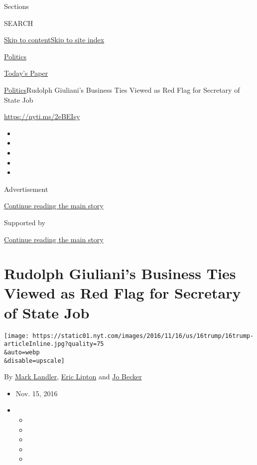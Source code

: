 Sections

SEARCH

\protect\hyperlink{site-content}{Skip to
content}\protect\hyperlink{site-index}{Skip to site index}

\href{https://www.nytimes.com/section/politics}{Politics}

\href{https://myaccount.nytimes.com/auth/login?response_type=cookie\&client_id=vi}{}

\href{https://www.nytimes.com/section/todayspaper}{Today's Paper}

\href{/section/politics}{Politics}\textbar{}Rudolph Giuliani's Business
Ties Viewed as Red Flag for Secretary of State Job

\url{https://nyti.ms/2eBEIsy}

\begin{itemize}
\item
\item
\item
\item
\item
\end{itemize}

Advertisement

\protect\hyperlink{after-top}{Continue reading the main story}

Supported by

\protect\hyperlink{after-sponsor}{Continue reading the main story}

\hypertarget{rudolph-giulianis-business-ties-viewed-as-red-flag-for-secretary-of-state-job}{%
\section{Rudolph Giuliani's Business Ties Viewed as Red Flag for
Secretary of State
Job}\label{rudolph-giulianis-business-ties-viewed-as-red-flag-for-secretary-of-state-job}}

\texttt{[image: https://static01.nyt.com/images/2016/11/16/us/16trump/16trump-articleInline.jpg?quality=75\\\&auto=webp\\\&disable=upscale]}

By \href{http://www.nytimes.com/by/mark-landler}{Mark Landler},
\href{http://www.nytimes.com/by/eric-lipton}{Eric Lipton} and
\href{http://www.nytimes.com/by/jo-becker}{Jo Becker}

\begin{itemize}
\item
  Nov. 15, 2016
\item
  \begin{itemize}
  \item
  \item
  \item
  \item
  \item
  \end{itemize}
\end{itemize}

